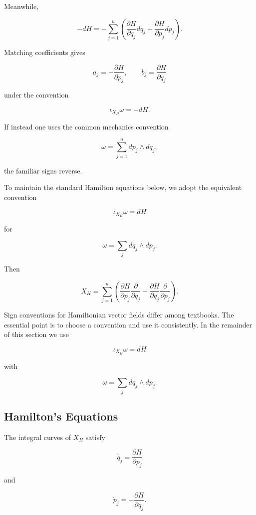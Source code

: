 Meanwhile,

\[
-dH
=
-\sum_{j=1}^{n}
\left(
\frac{\partial H}{\partial q_j}dq_j
+
\frac{\partial H}{\partial p_j}dp_j
\right).
\]

Matching coefficients gives

\[
a_j
=
-\frac{\partial H}{\partial p_j},
\qquad
b_j
=
\frac{\partial H}{\partial q_j}
\]

under the convention

\[
\iota_{X_H}\omega=-dH.
\]

If instead one uses the common mechanics convention

\[
\omega
=
\sum_{j=1}^{n}
dp_j\wedge dq_j,
\]

the familiar signs reverse.

To maintain the standard Hamilton equations below, we adopt the equivalent
convention

\[
\boxed{
\iota_{X_H}\omega=dH
}
\]

for

\[
\omega=\sum_j dq_j\wedge dp_j.
\]

Then

\[
\boxed{
X_H
=
\sum_{j=1}^{n}
\left(
\frac{\partial H}{\partial p_j}
\frac{\partial}{\partial q_j}
-
\frac{\partial H}{\partial q_j}
\frac{\partial}{\partial p_j}
\right).
}
\]

\begin{notebox}
Sign conventions for Hamiltonian vector fields differ among textbooks.
The essential point is to choose a convention and use it consistently.
In the remainder of this section we use

\[
\iota_{X_H}\omega=dH
\]

with

\[
\omega=\sum_j dq_j\wedge dp_j.
\]
\end{notebox}

\subsection{Hamilton's Equations}
\label{subsec:hamiltons-equations}

The integral curves of \(X_H\) satisfy

\[
\boxed{
\dot q_j
=
\frac{\partial H}{\partial p_j}
}
\]

and

\[
\boxed{
\dot p_j
=
-
\frac{\partial H}{\partial q_j}.
}
\]

